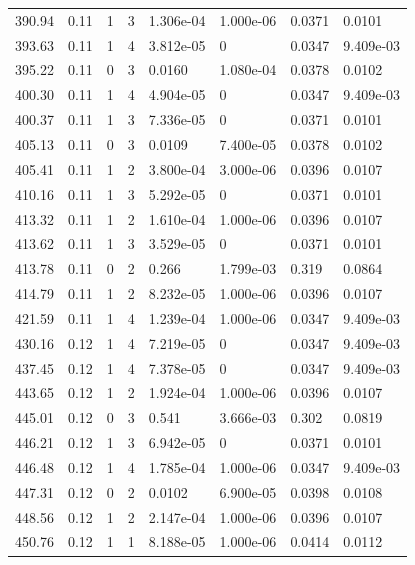 \documentclass[preview]{standalone}
\begin{document}
{{{\begin{tabular}{L{1.2cm}C{1.2cm} C{0.3cm}C{0.5cm} C{1.4cm}C{1.4cm} C{1.4cm}C{1.4cm}}
  390.94  &  0.11  & 1     &  3 &  1.306e-04  & 1.000e-06  & 0.0371 &  0.0101   \\ 
  393.63  &  0.11  & 1     &  4 &  3.812e-05  & 0  & 0.0347 &  9.409e-03   \\ 
  395.22  &  0.11  & 0     &  3 &  0.0160  & 1.080e-04  & 0.0378 &  0.0102   \\ 
  400.30  &  0.11  & 1     &  4 &  4.904e-05  & 0  & 0.0347 &  9.409e-03   \\ 
  400.37  &  0.11  & 1     &  3 &  7.336e-05  & 0  & 0.0371 &  0.0101   \\ 
  405.13  &  0.11  & 0     &  3 &  0.0109  & 7.400e-05  & 0.0378 &  0.0102   \\ 
  405.41  &  0.11  & 1     &  2 &  3.800e-04  & 3.000e-06  & 0.0396 &  0.0107   \\ 
  410.16  &  0.11  & 1     &  3 &  5.292e-05  & 0  & 0.0371 &  0.0101   \\ 
  413.32  &  0.11  & 1     &  2 &  1.610e-04  & 1.000e-06  & 0.0396 &  0.0107   \\ 
  413.62  &  0.11  & 1     &  3 &  3.529e-05  & 0  & 0.0371 &  0.0101   \\ 
  413.78  &  0.11  & 0     &  2 &  0.266  & 1.799e-03  & 0.319 &  0.0864   \\ 
  414.79  &  0.11  & 1     &  2 &  8.232e-05  & 1.000e-06  & 0.0396 &  0.0107   \\ 
  421.59  &  0.11  & 1     &  4 &  1.239e-04  & 1.000e-06  & 0.0347 &  9.409e-03   \\ 
  430.16  &  0.12  & 1     &  4 &  7.219e-05  & 0  & 0.0347 &  9.409e-03   \\ 
  437.45  &  0.12  & 1     &  4 &  7.378e-05  & 0  & 0.0347 &  9.409e-03   \\ 
  443.65  &  0.12  & 1     &  2 &  1.924e-04  & 1.000e-06  & 0.0396 &  0.0107   \\ 
  445.01  &  0.12  & 0     &  3 &  0.541  & 3.666e-03  & 0.302 &  0.0819   \\ 
  446.21  &  0.12  & 1     &  3 &  6.942e-05  & 0  & 0.0371 &  0.0101   \\ 
  446.48  &  0.12  & 1     &  4 &  1.785e-04  & 1.000e-06  & 0.0347 &  9.409e-03   \\ 
  447.31  &  0.12  & 0     &  2 &  0.0102  & 6.900e-05  & 0.0398 &  0.0108   \\ 
  448.56  &  0.12  & 1     &  2 &  2.147e-04  & 1.000e-06  & 0.0396 &  0.0107   \\ 
  450.76  &  0.12  & 1     &  1 &  8.188e-05  & 1.000e-06  & 0.0414 &  0.0112   \\ 

\end{tabular}}}}
\end{document}

